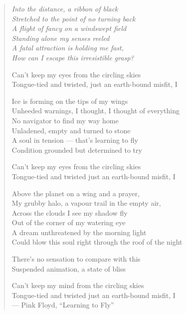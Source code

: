 \vspace*{1.5cm}
\begin{verse} \it
Into the distance, a ribbon of black\\
Stretched to the point of no turning back\\
A flight of fancy on a windswept field\\
Standing alone my senses reeled\\
A fatal attraction is holding me fast,\\
How can I escape this irresistible grasp?

Can't keep my eyes from the circling skies\\
Tongue-tied and twisted, just an earth-bound misfit, I

Ice is forming on the tips of my wings\\
Unheeded warnings, I thought, I thought of everything\\
No navigator to find my way home\\
Unladened, empty and turned to stone\\
A soul in tension --- that's learning to fly\\
Condition grounded but determined to try

Can't keep my eyes from the circling skies\\
Tongue-tied and twisted just an earth-bound misfit, I

Above the planet on a wing and a prayer,\\
My grubby halo, a vapour trail in the empty air,\\
Across the clouds I see my shadow fly\\
Out of the corner of my watering eye\\
A dream unthreatened by the morning light\\
Could blow this soul right through the roof of the night

There's no sensation to compare with this\\
Suspended animation, a state of bliss

Can't keep my mind from the circling skies\\
Tongue-tied and twisted just an earth-bound misfit, I \\
\vspace*{1em}
\hspace*{10em} --- Pink Floyd, ``Learning to Fly''
\end{verse}


